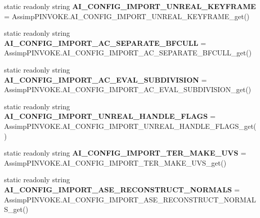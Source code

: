 \begin{DoxyCompactItemize}
\item 
\hypertarget{class_assimp_abe5182f476991cf007c0462194eee951}{static readonly string {\bfseries A\+I\+\_\+\+C\+O\+N\+F\+I\+G\+\_\+\+I\+M\+P\+O\+R\+T\+\_\+\+U\+N\+R\+E\+A\+L\+\_\+\+K\+E\+Y\+F\+R\+A\+M\+E} = Assimp\+P\+I\+N\+V\+O\+K\+E.\+A\+I\+\_\+\+C\+O\+N\+F\+I\+G\+\_\+\+I\+M\+P\+O\+R\+T\+\_\+\+U\+N\+R\+E\+A\+L\+\_\+\+K\+E\+Y\+F\+R\+A\+M\+E\+\_\+get()}\label{class_assimp_abe5182f476991cf007c0462194eee951}

\item 
\hypertarget{class_assimp_a53bc0fa26d1e7e3875c9c786b40b43c5}{static readonly string {\bfseries A\+I\+\_\+\+C\+O\+N\+F\+I\+G\+\_\+\+I\+M\+P\+O\+R\+T\+\_\+\+A\+C\+\_\+\+S\+E\+P\+A\+R\+A\+T\+E\+\_\+\+B\+F\+C\+U\+L\+L} = Assimp\+P\+I\+N\+V\+O\+K\+E.\+A\+I\+\_\+\+C\+O\+N\+F\+I\+G\+\_\+\+I\+M\+P\+O\+R\+T\+\_\+\+A\+C\+\_\+\+S\+E\+P\+A\+R\+A\+T\+E\+\_\+\+B\+F\+C\+U\+L\+L\+\_\+get()}\label{class_assimp_a53bc0fa26d1e7e3875c9c786b40b43c5}

\item 
\hypertarget{class_assimp_ada1c790320526d234e7b6b7da1210222}{static readonly string {\bfseries A\+I\+\_\+\+C\+O\+N\+F\+I\+G\+\_\+\+I\+M\+P\+O\+R\+T\+\_\+\+A\+C\+\_\+\+E\+V\+A\+L\+\_\+\+S\+U\+B\+D\+I\+V\+I\+S\+I\+O\+N} = Assimp\+P\+I\+N\+V\+O\+K\+E.\+A\+I\+\_\+\+C\+O\+N\+F\+I\+G\+\_\+\+I\+M\+P\+O\+R\+T\+\_\+\+A\+C\+\_\+\+E\+V\+A\+L\+\_\+\+S\+U\+B\+D\+I\+V\+I\+S\+I\+O\+N\+\_\+get()}\label{class_assimp_ada1c790320526d234e7b6b7da1210222}

\item 
\hypertarget{class_assimp_a6027ec73c092bda8898cec583ea976bb}{static readonly string {\bfseries A\+I\+\_\+\+C\+O\+N\+F\+I\+G\+\_\+\+I\+M\+P\+O\+R\+T\+\_\+\+U\+N\+R\+E\+A\+L\+\_\+\+H\+A\+N\+D\+L\+E\+\_\+\+F\+L\+A\+G\+S} = Assimp\+P\+I\+N\+V\+O\+K\+E.\+A\+I\+\_\+\+C\+O\+N\+F\+I\+G\+\_\+\+I\+M\+P\+O\+R\+T\+\_\+\+U\+N\+R\+E\+A\+L\+\_\+\+H\+A\+N\+D\+L\+E\+\_\+\+F\+L\+A\+G\+S\+\_\+get()}\label{class_assimp_a6027ec73c092bda8898cec583ea976bb}

\item 
\hypertarget{class_assimp_ac396a512e4e8ebe71d767e9fa434202a}{static readonly string {\bfseries A\+I\+\_\+\+C\+O\+N\+F\+I\+G\+\_\+\+I\+M\+P\+O\+R\+T\+\_\+\+T\+E\+R\+\_\+\+M\+A\+K\+E\+\_\+\+U\+V\+S} = Assimp\+P\+I\+N\+V\+O\+K\+E.\+A\+I\+\_\+\+C\+O\+N\+F\+I\+G\+\_\+\+I\+M\+P\+O\+R\+T\+\_\+\+T\+E\+R\+\_\+\+M\+A\+K\+E\+\_\+\+U\+V\+S\+\_\+get()}\label{class_assimp_ac396a512e4e8ebe71d767e9fa434202a}

\item 
\hypertarget{class_assimp_a28148c58a91e1faea348425bd219d97a}{static readonly string {\bfseries A\+I\+\_\+\+C\+O\+N\+F\+I\+G\+\_\+\+I\+M\+P\+O\+R\+T\+\_\+\+A\+S\+E\+\_\+\+R\+E\+C\+O\+N\+S\+T\+R\+U\+C\+T\+\_\+\+N\+O\+R\+M\+A\+L\+S} = Assimp\+P\+I\+N\+V\+O\+K\+E.\+A\+I\+\_\+\+C\+O\+N\+F\+I\+G\+\_\+\+I\+M\+P\+O\+R\+T\+\_\+\+A\+S\+E\+\_\+\+R\+E\+C\+O\+N\+S\+T\+R\+U\+C\+T\+\_\+\+N\+O\+R\+M\+A\+L\+S\+\_\+get()}\label{class_assimp_a28148c58a91e1faea348425bd219d97a}


\end{DoxyCompactItemize}
